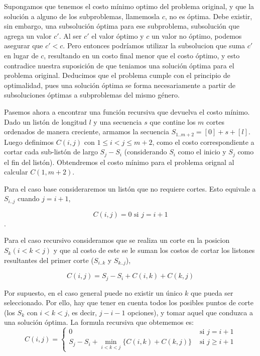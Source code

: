 Supongamos que tenemos el costo m\'inimo optimo del problema original, y que la soluci\'on a alguno de los subproblemas, llamemosla $c$, no es \'optima.
Debe existir, sin embargo, una subsoluci\'on \'optima para ese subproblema, subsoluci\'on que agrega un valor $c'$. 
Al ser $c'$ el valor \'optimo y $c$ un valor no \'optimo,  podemos asegurar que $c' < c$. 
Pero entonces podr\'iamos utilizar la subsolucion que suma $c'$ en lugar de $c$, resultando en un costo 
final menor que el costo \'optimo, y esto contradice nuestra suposici\'on de que teniamos una soluci\'on \'optima para 
el problema original. Deducimos que el problema cumple con el principio de optimalidad, pues una soluci\'on \'optima se forma necesariamente a partir de
subsoluciones \'optimas a subproblemas del mismo g\'enero.

Pasemos ahora a encontrar una funci\'on recursiva que devuelva el costo m\'inimo. Dado un list\'on de longitud $l$
y una secuencia $s$ que contine los $m$ cortes ordenados de manera creciente, armamos la secuencia $S_{1..m+2} = [0] + s + [l]$.
Luego definimos $C(i, j)$ con $1 \leq i < j \leq m+2$, como el costo correspondiente a cortar cada sub-list\'on de largo
$S_{j} - S_{i}$ (considerando $S_{i}$ como el inicio y $S_{j}$ como el fin del list\'on). 
Obtendremos el costo m\'inimo para el problema orignal al calcular $C(1, m+2)$.

Para el caso base consideraremos un list\'on que no requiere cortes. Esto equivale a $S_{i..j}$ cuando $j = i + 1$,

$$ C(i, j) = 0 \mbox{ si } j = i+1 $$.

Para el caso recursivo consideramos que se realiza un corte en la posicion $S_{k} (i < k < j)$ y que al costo
de este se le suman los costos de cortar los listones resultantes del primer corte ($S_{i..k}$ y $S_{k..j}$), 

    $$C(i, j) = S_{j} - S_{i} + C(i, k) + C(k, j)$$

Por supuesto, en el caso general puede no existir un \'unico $k$ que pueda ser seleccionado. Por ello, hay que tener en 
cuenta todos los posibles puntos de corte (los $S_{k}$ con $i < k < j$, es decir, $j-i-1$ opciones), y tomar aquel que 
conduzca a una soluci\'on \'optima.
La formula recursiva que obtememos es: \\
$$
C(i, j) =
   \begin{cases}
      0 & \mbox{ si } j = i+1   \\
      S_{j} - S_{i} + \displaystyle\min_{i < k < j}\{C(i, k) + C(k, j)\} & \mbox{ si } j \geq i+1
   \end{cases}
$$
\\

